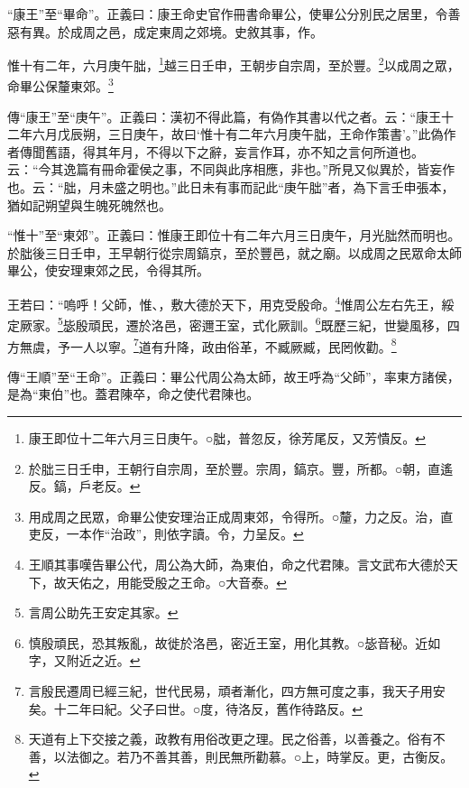 {\noindent\shu{}\fzkt “康王”至“畢命”。正義曰：康王命史官作冊書命畢公，使畢公分別民之居里，令善惡有異。於成周之邑，成定東周之郊境。史敘其事，作。 \par}

惟十有二年，六月庚午朏，\footnote{康王即位十二年六月三日庚午。○朏，普忽反，徐芳尾反，又芳憒反。}越三日壬申，王朝步自宗周，至於豐。\footnote{於朏三日壬申，王朝行自宗周，至於豐。宗周，鎬京。豐，所都。○朝，直遙反。鎬，戶老反。}以成周之眾，命畢公保釐東郊。\footnote{用成周之民眾，命畢公使安理治正成周東郊，令得所。○釐，力之反。治，直吏反，一本作“治政”，則依字讀。令，力呈反。}


{\noindent\zhuan{}\fzbyks 傳“康王”至“庚午”。正義曰：漢初不得此篇，有偽作其書以代之者。云：“康王十二年六月戊辰朔，三日庚午，故曰‘惟十有二年六月庚午朏，王命作策書’。”此偽作者傳聞舊語，得其年月，不得以下之辭，妄言作耳，亦不知之言何所道也。云：“今其逸篇有冊命霍侯之事，不同與此序相應，非也。”所見又似異於，皆妄作也。云：“朏，月未盛之明也。”此日未有事而記此“庚午朏”者，為下言壬申張本，猶如記朔望與生魄死魄然也。 \par}

{\noindent\shu{}\fzkt “惟十”至“東郊”。正義曰：惟康王即位十有二年六月三日庚午，月光朏然而明也。於朏後三日壬申，王早朝行從宗周鎬京，至於豐邑，就之廟。以成周之民眾命太師畢公，使安理東郊之民，令得其所。 \par}

王若曰：“嗚呼！父師，惟、，敷大德於天下，用克受殷命。\footnote{王順其事嘆告畢公代，周公為大師，為東伯，命之代君陳。言文武布大德於天下，故天佑之，用能受殷之王命。○大音泰。}惟周公左右先王，綏定厥家。\footnote{言周公助先王安定其家。}毖殷頑民，遷於洛邑，密邇王室，式化厥訓。\footnote{慎殷頑民，恐其叛亂，故徙於洛邑，密近王室，用化其教。○毖音秘。近如字，又附近之近。}既歷三紀，世變風移，四方無虞，予一人以寧。\footnote{言殷民遷周已經三紀，世代民易，頑者漸化，四方無可度之事，我天子用安矣。十二年曰紀。父子曰世。○度，待洛反，舊作待路反。}道有升降，政由俗革，不臧厥臧，民罔攸勸。\footnote{天道有上下交接之義，政教有用俗改更之理。民之俗善，以善養之。俗有不善，以法御之。若乃不善其善，則民無所勸慕。○上，時掌反。更，古衡反。}


{\noindent\zhuan{}\fzbyks 傳“王順”至“王命”。正義曰：畢公代周公為太師，故王呼為“父師”，率東方諸侯，是為“東伯”也。蓋君陳卒，命之使代君陳也。 \par}

